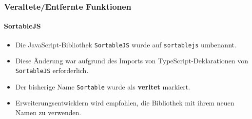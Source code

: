%

\begin{frame}[fragile]
	\frametitle{Veraltete/Entfernte Funktionen}
	\framesubtitle{SortableJS}

	\begin{itemize}
		\item Die JavaScript-Bibliothek \texttt{SortableJS} wurde auf \texttt{sortablejs} umbenannt.

		\item Diese Änderung war aufgrund des Imports von TypeScript-Deklarationen 
			von \texttt{SortableJS} erforderlich.

		\item Der bisherige Name \texttt{Sortable} wurde als \textbf{verltet} markiert.

		\item Erweiterungsentwicklern wird empfohlen, die Bibliothek mit ihrem neuen Namen zu verwenden.
	\end{itemize}

\end{frame}

